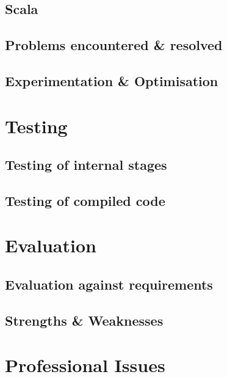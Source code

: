 \documentclass[11pt]{report}
\begin{document}
\section{Scala}
\section{Problems encountered \& resolved}
\section{Experimentation \& Optimisation}

\chapter{Testing}
\section{Testing of internal stages}
\section{Testing of compiled code}


\chapter{Evaluation}
\section{Evaluation against requirements}
\section{Strengths \& Weaknesses}

\chapter{Professional Issues}
\end{document}
